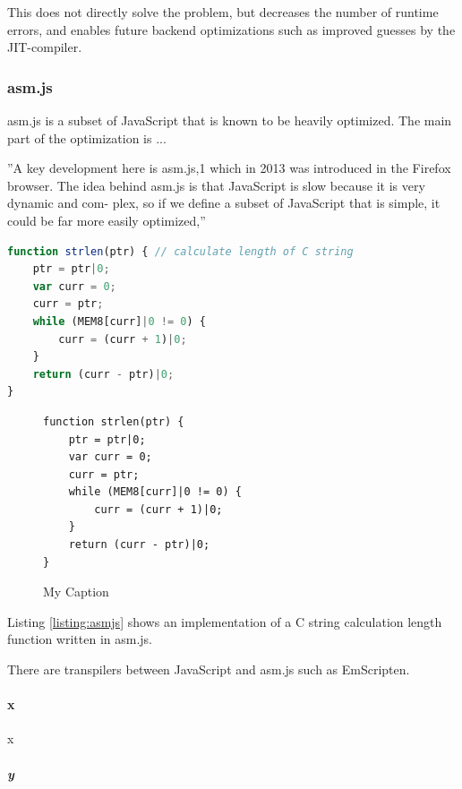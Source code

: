 This does not directly solve the problem, but decreases the number of runtime errors, and enables future backend optimizations such as improved guesses by the JIT-compiler.

\subsubsection{asm.js}

asm.js is a subset of JavaScript that is known to be heavily optimized. The main part of the optimization is ...

''A key development here is asm.js,1 which in 2013 was introduced in the Firefox browser. The idea behind asm.js is that JavaScript is slow because it is very dynamic and com- plex, so if we define a subset of JavaScript that is simple, it could be far more easily optimized,'' \parencite{Zakai2018}

\begin{lstlisting}[label=listing:asmjs,language=JavaScript,caption=asm.js]
function strlen(ptr) { // calculate length of C string
    ptr = ptr|0;
    var curr = 0;
    curr = ptr;
    while (MEM8[curr]|0 != 0) {
        curr = (curr + 1)|0;
    }
    return (curr - ptr)|0;
}
\end{lstlisting}

\begin{figure}
    \begin{small}
    \begin{verbatim}
function strlen(ptr) {
    ptr = ptr|0;
    var curr = 0;
    curr = ptr;
    while (MEM8[curr]|0 != 0) {
        curr = (curr + 1)|0;
    }
    return (curr - ptr)|0;
}
    \end{verbatim}
    \end{small}
    \caption{My Caption}
    \label{my-label}
\end{figure}

Listing \ref{listing:asmjs} shows an implementation of a C string calculation length function written in asm.js.

There are transpilers between JavaScript and asm.js such as EmScripten.

\paragraph{x}

x

\subparagraph{y}

